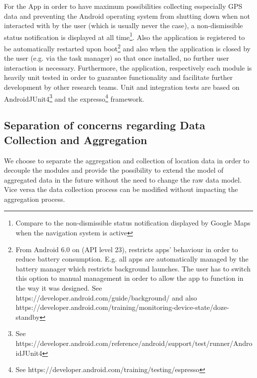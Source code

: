 For the App in order to have maximum possibilities collecting esspecially GPS data and preventing the Android operating system from shutting down when not interacted with by the user (which is usually never the case), a non-dismissible status notification is displayed at all time\footnote{Compare to the non-dismissible status notification displayed by Google Maps when the navigation system is active}. Also the application is registered to be automatically restarted upon boot\footnote{From Android 6.0 on (API level 23), restricts apps' behaviour in order to reduce battery consumption. E.g. all apps are automatically managed by the battery manager which restricts background launches. The user has to switch this option to manual management in order to allow the app to function in the way it was designed. See https://developer.android.com/guide/background/ and also https://developer.android.com/training/monitoring-device-state/doze-standby} and also when the application is closed by the user (e.g. via the task manager) so that once installed, no further user interaction is necessary.
Furthermore, the application, respectively each module is heavily unit tested in order to guarantee functionality and facilitate further development by other research teams. Unit and integration tests are based on AndroidJUnit4\footnote{See https://developer.android.com/reference/android/support/test/runner/AndroidJUnit4} and the expresso\footnote{See https://developer.android.com/training/testing/espresso} framework.

\subsection{Separation of concerns regarding Data Collection and Aggregation}
We choose to separate the aggregation and collection of location data in order to decouple the modules and provide the possibility to extend the model of aggregated data in the future without the need to change the raw data model. Vice versa the data collection process can be modified without impacting the aggregation process.

